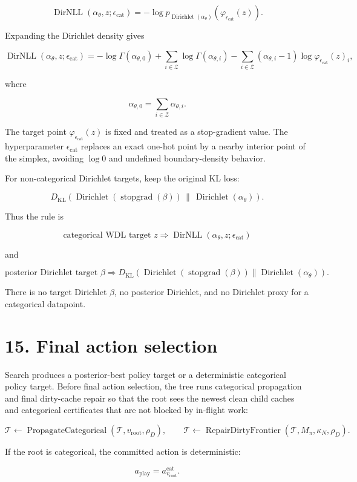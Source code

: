 \documentclass[11pt]{article}
\newcommand{\Dir}{\operatorname{Dirichlet}}
\newcommand{\stopgrad}{\operatorname{stopgrad}}
\newcommand{\Tree}{\mathcal{T}}
\newcommand{\Z}{\mathcal{Z}}
\newcommand{\RepairDirtyFrontier}{\operatorname{RepairDirtyFrontier}}
\newcommand{\KL}{D_{\mathrm{KL}}}
\newcommand{\epscat}{\epsilon_{\mathrm{cat}}}
\newcommand{\CatPoint}{\varphi_{\epsilon_{\mathrm{cat}}}}
\newcommand{\DirNLL}{\operatorname{DirNLL}}
\newcommand{\PropagateCategorical}{\operatorname{PropagateCategorical}}
\begin{document}
\[
\DirNLL(\alpha_\theta,z;\epscat)
=
-\log p_{\Dir(\alpha_\theta)}(\CatPoint(z)).
\]

Expanding the Dirichlet density gives

\[
\DirNLL(\alpha_\theta,z;\epscat)
=
-\log\Gamma(\alpha_{\theta,0})
+
\sum_{i\in\Z}\log\Gamma(\alpha_{\theta,i})
-
\sum_{i\in\Z}(\alpha_{\theta,i}-1)\log \CatPoint(z)_i,
\]

where

\[
\alpha_{\theta,0}=\sum_{i\in\Z}\alpha_{\theta,i}.
\]

The target point \(\CatPoint(z)\) is fixed and treated as a stop-gradient value.
The hyperparameter \(\epscat\) replaces an exact one-hot point by a nearby
interior point of the simplex, avoiding \(\log 0\) and undefined boundary-density
behavior.

For non-categorical Dirichlet targets, keep the original KL loss:

\[
\KL
\left(
\Dir(\stopgrad(\beta))
\,\|\,
\Dir(\alpha_\theta)
\right).
\]

Thus the rule is

\[
\boxed{
\text{categorical WDL target }z
\Rightarrow
\DirNLL(\alpha_\theta,z;\epscat)
}
\]

and

\[
\boxed{
\text{posterior Dirichlet target }\beta
\Rightarrow
\KL(\Dir(\stopgrad(\beta))\|\Dir(\alpha_\theta)).
}
\]

There is no target Dirichlet \(\beta\), no posterior Dirichlet, and no Dirichlet
proxy for a categorical datapoint.

\section*{15. Final action selection}

Search produces a posterior-best policy target or a deterministic categorical
policy target. Before final action selection, the tree runs categorical
propagation and final dirty-cache repair so that the root sees the newest clean
child caches and categorical certificates that are not blocked by in-flight work:

\[
\Tree\gets\PropagateCategorical(\Tree,v_{\mathrm{root}},\rho_D),
\qquad
\Tree\gets\RepairDirtyFrontier(\Tree,M_\pi,\kappa_N,\rho_D).
\]

If the root is categorical, the committed action is deterministic:

\[
a_{\mathrm{play}}
=
a_{v_{\mathrm{root}}}^{\mathrm{cat}}.
\]
\end{document}
